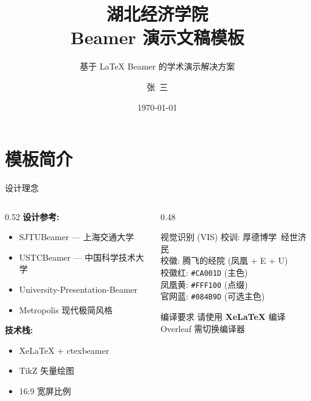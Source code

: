 \documentclass[aspectratio=169, 10pt, UTF8]{ctexbeamer}
\title[HBUE Beamer 模板]{湖北经济学院\\Beamer 演示文稿模板}
\subtitle{基于 \LaTeX{} Beamer 的学术演示解决方案}
\author[张三]{张\ 三}
\institute[HBUE]{湖北经济学院\ \ 信息管理学院\\Hubei University of Economics}
\date{\today}
\begin{document}
{
\begin{frame}
  \titlepage
\end{frame}
}

\tocpage

\section{模板简介}

\begin{frame}{设计理念}
  \begin{columns}[T]
    \begin{column}{0.52\textwidth}
      \textbf{设计参考:}
      \begin{itemize}
        \item SJTUBeamer — 上海交通大学
        \item USTCBeamer — 中国科学技术大学
        \item University-Presentation-Beamer
        \item Metropolis 现代极简风格
      \end{itemize}
      \vspace{0.8em}
      \textbf{技术栈:}
      \begin{itemize}
        \item XeLaTeX + ctexbeamer
        \item TikZ 矢量绘图
        \item 16:9 宽屏比例
      \end{itemize}
    \end{column}
    \begin{column}{0.48\textwidth}
      \begin{block}{视觉识别 (VIS)}
        校训: 厚德博学\ 经世济民\\
        校徽: 腾飞的经院 (凤凰 + E + U)\\
        校徽红: \texttt{\#CA001D} (主色)\\
        凤凰黄: \texttt{\#FFF100} (点缀)\\
        官网蓝: \texttt{\#084B9D} (可选主色)
      \end{block}
      \begin{alertblock}{编译要求}
        请使用 \textbf{XeLaTeX} 编译\\
        Overleaf 需切换编译器
      \end{alertblock}
    \end{column}
  \end{columns}
\end{frame}
\end{document}
